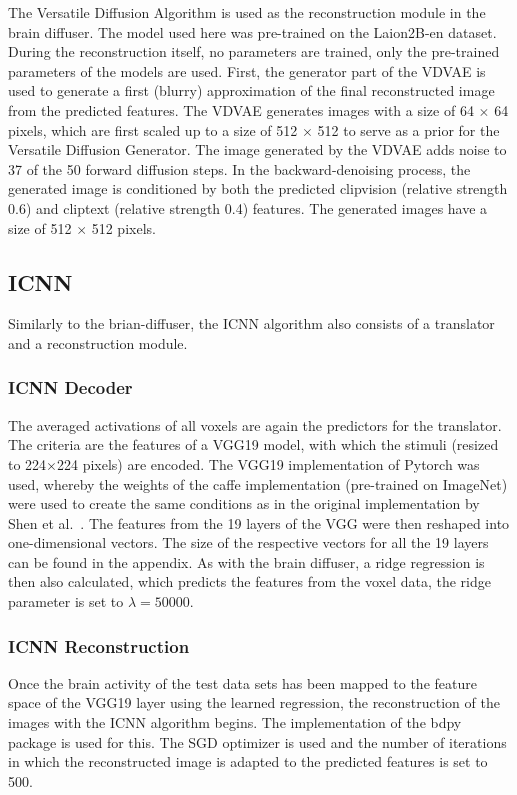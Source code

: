 The Versatile Diffusion Algorithm\cite{xuVersatileDiffusionText2024} is used as the reconstruction module in the brain diffuser. The model used here was pre-trained on the Laion2B-en\cite{schuhmannLAION400MOpenDataset2021} dataset. During the reconstruction itself, no parameters are trained, only the pre-trained parameters of the models are used. First, the generator part of the VDVAE is used to generate a first (blurry) approximation of the final reconstructed image from the predicted features. The VDVAE generates images with a size of 64 $\times$ 64 pixels, which are first scaled up to a size of 512 $\times$ 512 to serve as a prior for the Versatile Diffusion Generator. The image generated by the VDVAE adds noise to 37 of the 50 forward diffusion steps. In the backward-denoising process, the generated image is conditioned by both the predicted clipvision (relative strength 0.6) and cliptext (relative strength 0.4) features. The generated images have a size of 512 $\times$ 512 pixels. 

\subsection{ICNN}
Similarly to the brian-diffuser, the ICNN\cite{shenDeepImageReconstruction2019} algorithm also consists of a translator and a reconstruction module. 
\subsubsection{ICNN Decoder}
The averaged activations of all voxels are again the predictors for the translator. The criteria are the features of a VGG19\cite{simonyanVeryDeepConvolutional2014} model, with which the stimuli (resized to 224$\times$224 pixels) are encoded. The VGG19 implementation of Pytorch was used, whereby the weights of the caffe implementation\cite{ModelZoo} (pre-trained on ImageNet) were used to create the same conditions as in the original implementation by Shen et al.\ \cite{shenDeepImageReconstruction2019}. The features from the 19 layers of the VGG were then reshaped into one-dimensional vectors. The size of the respective vectors for all the 19 layers can be found in the appendix. As with the brain diffuser, a ridge regression is then also calculated, which predicts the features from the voxel data, the ridge parameter is set to $\lambda=50000$.

\subsubsection{ICNN Reconstruction}
Once the brain activity of the test data sets has been mapped to the feature space of the VGG19 layer using the learned regression, the reconstruction of the images with the ICNN algorithm\cite{shenDeepImageReconstruction2019} begins. The implementation of the bdpy package\cite{KamitaniLabBdpy2024} is used for this. The SGD optimizer is used and the number of iterations in which the reconstructed image is adapted to the predicted features is set to 500. 

